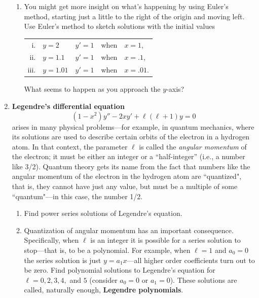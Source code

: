 \begin{enumerate}
  \begin{enumerate}
  \item You might get more
insight on what's happening by using Euler's method, starting just a
little to the right of the origin and moving left.  Use Euler's method
to sketch solutions with the initial values


\begin{tabular}{rllcl}
 i.& $y=2$ & $y'=1$& when &$x=1$, \\
  ii.& $y=1.1$ & $y'=1$ & when & $x=.1$, \\
 iii.& $y=1.01$ &  $y'=1$ & when & $x=.01.$ \\
 \end{tabular} 



What seems to happen as you approach the $y$-axis?


\end{enumerate}
\item {\bf Legendre's differential equation}
\[
(1 - x^2)y'' - 2xy' + \ell(\ell + 1)y = 0
\]
arises in many physical problems---for example, in quantum mechanics,
where its solutions are used to describe certain orbits of the
electron in a hydrogen atom.  In that context, the parameter $\ell$ is
called the {\em angular momentum} of the
electron; it must be either an integer or a ``half-integer'' (i.e., a
number like 3/2).  Quantum theory gets its name
from the fact that numbers like the angular momentum of the electron
in the hydrogen atom are ``quantized", that is, they cannot have just
any value, but must be a multiple of some
``quantum"---in this case, the number 1/2.

  \begin{enumerate}
  \item Find
power series solutions of Legendre's equation.

  \item Quantization of
angular momentum has an important consequence.  Specifically, when
$\ell$ is an integer it is possible for a series solution to
stop---that is, to be a polynomial.  For example, when $\ell = 1$ and
$a_0 = 0$ the series solution is just $y = a_1x$---all higher order
coefficients turn out to be zero.  Find polynomial solutions to
Legendre's equation for $\ell = 0, 2, 3, 4,$ and $5$ (consider $a_0=0$
or $a_1=0$).  These solutions are called, naturally enough, {\bf
  Legendre polynomials}.



\end{enumerate}
\end{enumerate}
